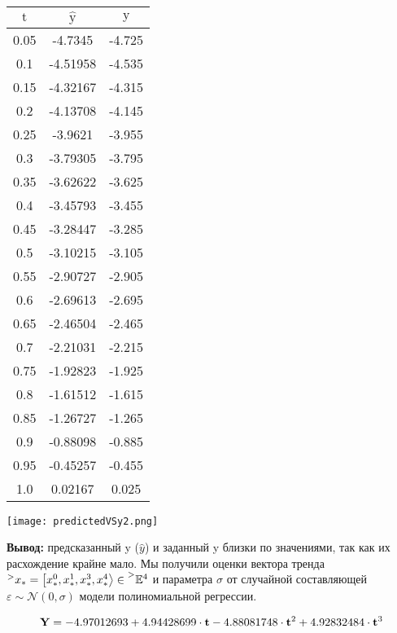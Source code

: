 \renewcommand{\arraystretch}{0.65}
\begin{center}
    \begin{tabular}{ | c | c | c | } 
    \hline
    $\textrm{t}$ & $\hat{\textrm{y}}$ & $\textrm{y}$ \\
    \hline
    0.05 & -4.7345 & -4.725 \\ 
    \hline 
   0.1 & -4.51958 & -4.535 \\ 
    \hline 
   0.15 & -4.32167 & -4.315 \\ 
    \hline 
   0.2 & -4.13708 & -4.145 \\ 
    \hline 
   0.25 & -3.9621 & -3.955 \\ 
    \hline 
   0.3 & -3.79305 & -3.795 \\ 
    \hline 
   0.35 & -3.62622 & -3.625 \\ 
    \hline 
   0.4 & -3.45793 & -3.455 \\ 
    \hline 
   0.45 & -3.28447 & -3.285 \\ 
    \hline 
   0.5 & -3.10215 & -3.105 \\ 
    \hline 
   0.55 & -2.90727 & -2.905 \\ 
    \hline 
   0.6 & -2.69613 & -2.695 \\ 
    \hline 
   0.65 & -2.46504 & -2.465 \\ 
    \hline 
   0.7 & -2.21031 & -2.215 \\ 
    \hline 
   0.75 & -1.92823 & -1.925 \\ 
    \hline 
   0.8 & -1.61512 & -1.615 \\ 
    \hline 
   0.85 & -1.26727 & -1.265 \\ 
    \hline 
   0.9 & -0.88098 & -0.885 \\ 
    \hline 
   0.95 & -0.45257 & -0.455 \\ 
    \hline 
   1.0 & 0.02167 & 0.025 \\ 
    \hline 
    \end{tabular}
\end{center}

\begin{center}
    \texttt{[image: predictedVSy2.png]}
\end{center}

\textbf{Вывод:} предсказанный y ($\hat{y}$) и заданный y близки по значениями, так как их расхождение крайне мало. Мы получили оценки вектора тренда
$\prescript{>}{}{x_*} = \left[ x^0_*, x^1_*, x^3_*, x^4_* \right> \in \prescript{>}{}{\mathbb{E}^{4}}$
и параметра $\sigma$ от случайной составляющей $\varepsilon \sim \mathcal{N}(0, \sigma)$ 
модели полиномиальной регрессии.

\begin{equation*}
    \textrm{\textbf{Y}} = -4.97012693 + 4.94428699 \cdot \textrm{\textbf{t}} - 4.88081748 \cdot \textrm{\textbf{t}}^2 + 4.92832484 \cdot \textrm{\textbf{t}}^3
\end{equation*}


